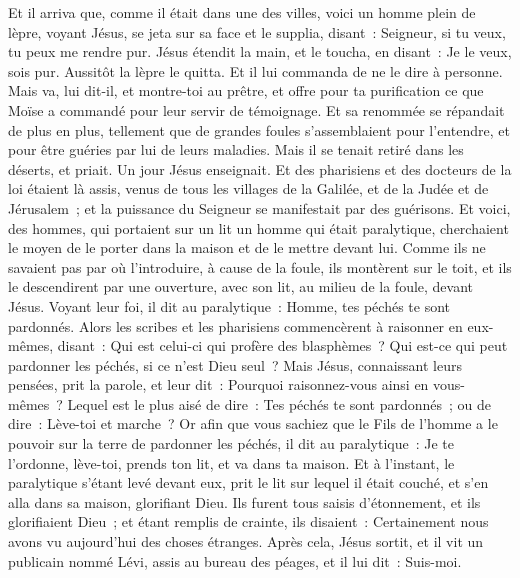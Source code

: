 \begin{multicols}{2}
Et il arriva que, comme il était dans une des villes, voici un homme plein de lèpre, voyant Jésus, se jeta sur sa face et le supplia, disant~: Seigneur, si tu veux, tu peux me rendre pur.
Jésus étendit la main, et le toucha, en disant~: Je le veux, sois pur. Aussitôt la lèpre le quitta.
Et il lui commanda de ne le dire à personne. Mais va, lui dit-il, et montre-toi au prêtre, et offre pour ta purification ce que Moïse a commandé pour leur servir de témoignage.
Et sa renommée se répandait de plus en plus, tellement que de grandes foules s'assemblaient pour l'entendre, et pour être guéries par lui de leurs maladies.
Mais il se tenait retiré dans les déserts, et priait.
Un jour Jésus enseignait. Et des pharisiens et des docteurs de la loi étaient là assis, venus de tous les villages de la Galilée, et de la Judée et de Jérusalem~; et la puissance du Seigneur se manifestait par des guérisons.
Et voici, des hommes, qui portaient sur un lit un homme qui était paralytique, cherchaient le moyen de le porter dans la maison et de le mettre devant lui.
Comme ils ne savaient pas par où l'introduire, à cause de la foule, ils montèrent sur le toit, et ils le descendirent par une ouverture, avec son lit, au milieu de la foule, devant Jésus.
Voyant leur foi, il dit au paralytique~: Homme, tes péchés te sont pardonnés.
Alors les scribes et les pharisiens commencèrent à raisonner en eux-mêmes, disant~: Qui est celui-ci qui profère des blasphèmes~? Qui est-ce qui peut pardonner les péchés, si ce n'est Dieu seul~?
Mais Jésus, connaissant leurs pensées, prit la parole, et leur dit~: Pourquoi raisonnez-vous ainsi en vous-mêmes~?
Lequel est le plus aisé de dire~: Tes péchés te sont pardonnés~; ou de dire~: Lève-toi et marche~?
Or afin que vous sachiez que le Fils de l'homme a le pouvoir sur la terre de pardonner les péchés, il dit au paralytique~: Je te l'ordonne, lève-toi, prends ton lit, et va dans ta maison.
Et à l'instant, le paralytique s'étant levé devant eux, prit le lit sur lequel il était couché, et s'en alla dans sa maison, glorifiant Dieu.
Ils furent tous saisis d'étonnement, et ils glorifiaient Dieu~; et étant remplis de crainte, ils disaient~: Certainement nous avons vu aujourd'hui des choses étranges.
Après cela, Jésus sortit, et il vit un publicain nommé Lévi, assis au bureau des péages, et il lui dit~: Suis-moi.

\end{multicols}
